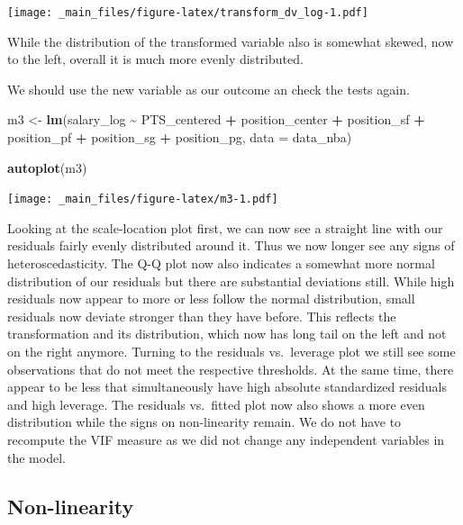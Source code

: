 \documentclass[
]{book}
\newenvironment{Shaded}{\begin{snugshade}}{\end{snugshade}}
\newcommand{\AttributeTok}[1]{\textcolor[rgb]{0.13,0.29,0.53}{#1}}
\newcommand{\FunctionTok}[1]{\textcolor[rgb]{0.13,0.29,0.53}{\textbf{#1}}}
\newcommand{\NormalTok}[1]{#1}
\newcommand{\OtherTok}[1]{\textcolor[rgb]{0.56,0.35,0.01}{#1}}
\newcommand{\SpecialCharTok}[1]{\textcolor[rgb]{0.81,0.36,0.00}{\textbf{#1}}}
\begin{document}
\texttt{[image: \_main\_files/figure-latex/transform\_dv\_log-1.pdf]}

While the distribution of the transformed variable also is somewhat skewed, now
to the left, overall it is much more evenly distributed.

We should use the new variable as our outcome an check the tests again.

\begin{Shaded}
\begin{Highlighting}[]
\NormalTok{m3 }\OtherTok{\textless{}{-}} \FunctionTok{lm}\NormalTok{(salary\_log }\SpecialCharTok{\textasciitilde{}}\NormalTok{ PTS\_centered }\SpecialCharTok{+}\NormalTok{ position\_center }\SpecialCharTok{+}\NormalTok{ position\_sf }\SpecialCharTok{+}\NormalTok{  position\_pf }\SpecialCharTok{+}\NormalTok{ position\_sg }\SpecialCharTok{+}\NormalTok{ position\_pg, }\AttributeTok{data =}\NormalTok{ data\_nba)}

\FunctionTok{autoplot}\NormalTok{(m3)}
\end{Highlighting}
\end{Shaded}

\texttt{[image: \_main\_files/figure-latex/m3-1.pdf]}

Looking at the scale-location plot first, we can now see a straight line with
our residuals fairly evenly distributed around it. Thus we now longer see any
signs of heteroscedasticity. The Q-Q plot now also indicates a somewhat more
normal distribution of our residuals but there are substantial deviations still.
While high residuals now appear to more or less follow the normal distribution,
small residuals now deviate stronger than they have before. This reflects the
transformation and its distribution, which now has long tail on the left and not
on the right anymore. Turning to the residuals vs.~leverage plot we still see
some observations that do not meet the respective thresholds. At the same time,
there appear to be less that simultaneously have high absolute standardized
residuals and high leverage. The residuals vs.~fitted plot now also shows a more
even distribution while the signs on non-linearity remain. We do not have to
recompute the VIF measure as we did not change any independent variables in the
model.

\hypertarget{non-linearity}{%
\subsection{Non-linearity}\label{non-linearity}}
\end{document}
